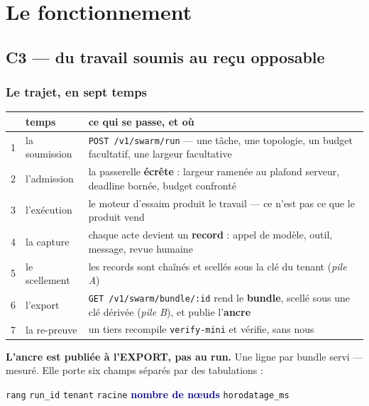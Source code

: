 \documentclass[10pt]{report}
\newcommand{\code}[1]{\texttt{\small #1}}
\newcommand{\mm}[1]{\textbf{\textcolor{navy}{#1}}}
\newcommand{\att}[1]{\textcolor{amber}{\textbf{#1}}}
\newcommand{\ctrois}{\textcolor{c3col}{\textbf{C3}}}
\begin{document}
\chapter{Le fonctionnement}

\section{\ctrois{} --- du travail soumis au reçu opposable}

\subsection{Le trajet, en sept temps}

\begin{longtable}{@{}c p{4.4cm} p{9.6cm}@{}}
\toprule & \textbf{temps} & \textbf{ce qui se passe, et où} \\ \midrule \endhead
1 & la soumission & \code{POST /v1/swarm/run} --- une tâche, une topologie, un budget facultatif, une largeur facultative \\
2 & l'admission & la passerelle \textbf{écrête} : largeur ramenée au plafond serveur, deadline bornée, budget confronté \\
3 & l'exécution & le moteur d'essaim produit le travail --- ce n'est pas ce que le produit vend \\
4 & la capture & chaque acte devient un \textbf{record} : appel de modèle, outil, message, revue humaine \\
5 & le scellement & les records sont chaînés et scellés sous la clé du tenant (\emph{pile A}) \\
6 & l'export & \code{GET /v1/swarm/bundle/:id} rend le \textbf{bundle}, scellé sous une clé dérivée (\emph{pile B}), et publie l'\textbf{ancre} \\
7 & la re-preuve & un tiers recompile \code{verify-mini} et vérifie, sans nous \\
\bottomrule
\end{longtable}

\att{L'ancre est publiée à l'EXPORT, pas au run.} Une ligne par bundle servi --- mesuré. Elle porte
six champs séparés par des tabulations :

\begin{extrait}
\footnotesize
\code{rang} \quad\textbullet\quad \code{run\_id} \quad\textbullet\quad \code{tenant} \quad\textbullet\quad
\code{racine} \quad\textbullet\quad \mm{nombre de nœuds} \quad\textbullet\quad \code{horodatage\_ms}
\end{extrait}
\end{document}
